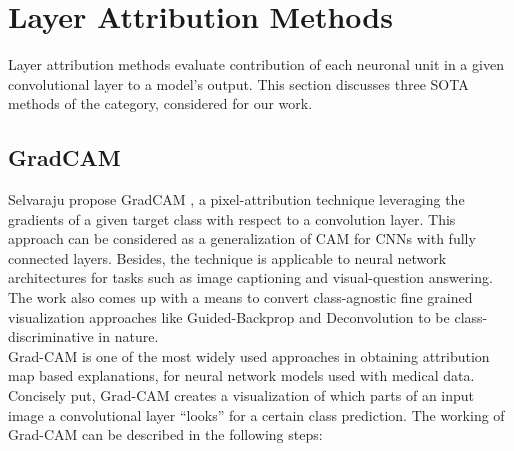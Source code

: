 \documentclass[../report.tex]{subfiles}
\begin{document}
\section{Layer Attribution Methods}
Layer attribution methods evaluate contribution of each neuronal unit in a given convolutional layer to a model's output. This section discusses three SOTA methods of the category, considered for our work.
\subsection{GradCAM}
\label{sec_gradcam}
Selvaraju \etal propose GradCAM \cite{selvaraju2017grad}, a pixel-attribution technique leveraging the gradients of a given target class with respect to a convolution layer. This approach can be considered as a generalization of CAM for CNNs with fully connected layers. Besides, the technique is applicable to neural network architectures for tasks such as image captioning and visual-question answering. The work also comes up with a means to convert class-agnostic fine grained visualization approaches like Guided-Backprop and Deconvolution to be class-discriminative in nature.\\
Grad-CAM is one of the most widely used approaches in obtaining attribution map based explanations, for neural network models used with medical data. Concisely put, Grad-CAM creates a visualization of which parts of an input image a convolutional layer “looks” for a certain class prediction. The working of Grad-CAM can be described in the following steps:
\end{document}
